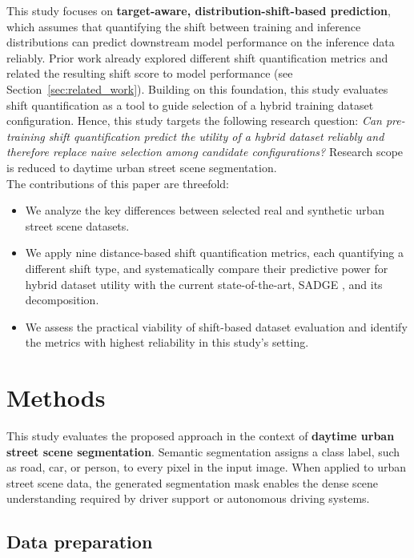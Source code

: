 \documentclass[conference]{IEEEtran}
\begin{document}
This study focuses on \textbf{target-aware, distribution-shift-based prediction}, which assumes that quantifying the shift between training and inference distributions can predict downstream model performance on the inference data reliably. Prior work already explored different shift quantification metrics and related the resulting shift score to model performance (see Section~\ref{sec:related_work}). Building on this foundation, this study evaluates shift quantification as a tool to guide selection of a hybrid training dataset configuration. Hence, this study targets the following research question: \textit{Can pre-training shift quantification predict the utility of a hybrid dataset reliably and therefore replace naive selection among candidate configurations?} Research scope is reduced to daytime urban street scene segmentation.\\

The contributions of this paper are threefold: 
\begin{itemize}
\item We analyze the key differences between selected real and synthetic urban street scene datasets.
\item We apply nine distance-based shift quantification metrics, each quantifying a different shift type, and systematically compare their predictive power for hybrid dataset utility with the current state-of-the-art, SADGE \cite{bartkowiak2026}, and its decomposition.
\item We assess the practical viability of shift-based dataset evaluation and identify the metrics with highest reliability in this study's setting.
\end{itemize}

\newpage
\section{Methods}
This study evaluates the proposed approach in the context of \textbf{daytime urban street scene segmentation}. Semantic segmentation assigns a class label, such as road, car, or person, to every pixel in the input image. When applied to urban street scene data, the generated segmentation mask enables the dense scene understanding required by driver support or autonomous driving systems.

\subsection{Data preparation}
\label{sec:datasetPreparation}
\end{document}
